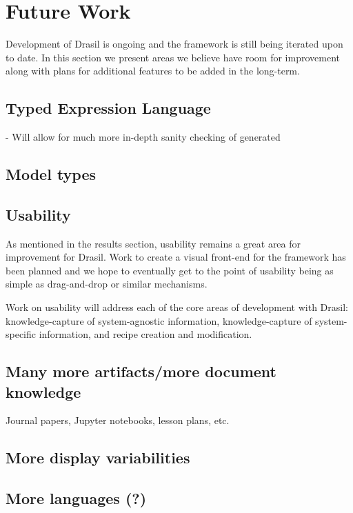 \chapter{Future Work}
\label{c:future}

Development of Drasil is ongoing and the framework is still being iterated upon
to date. In this section we present areas we believe have room for improvement
along with plans for additional features to be added in the long-term.

\section{Typed Expression Language}
- Will allow for much more in-depth sanity checking of generated \sfs{}

\section{Model types}

\section{Usability}
As mentioned in the results section, usability remains a great area for
improvement for Drasil. Work to create a visual front-end for the framework
has been planned and we hope to eventually get to the point of usability being
as simple as drag-and-drop or similar mechanisms.

Work on usability will address each of the core areas of development with
Drasil: knowledge-capture of system-agnostic information,
knowledge-capture of system-specific information, and recipe creation and
modification.
\section{Many more artifacts/more document knowledge}

Journal papers, Jupyter notebooks, lesson plans, etc.

\section{More display variabilities}

\section{More languages (?)}

